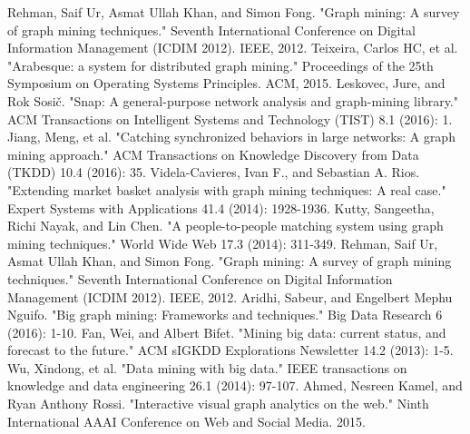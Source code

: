 \documentclass[letterpaper, 10 pt, conference]{ieeeconf}
\begin{document}
\addtolength{\textheight}{-12cm}

\hfill
\begin{thebibliography}{99}

 Rehman, Saif Ur, Asmat Ullah Khan, and Simon Fong. "Graph mining: A survey of graph mining techniques." Seventh International Conference on Digital Information Management (ICDIM 2012). IEEE, 2012.
 Teixeira, Carlos HC, et al. "Arabesque: a system for distributed graph mining." Proceedings of the 25th Symposium on Operating Systems Principles. ACM, 2015.
 Leskovec, Jure, and Rok Sosič. "Snap: A general-purpose network analysis and graph-mining library." ACM Transactions on Intelligent Systems and Technology (TIST) 8.1 (2016): 1.
 Jiang, Meng, et al. "Catching synchronized behaviors in large networks: A graph mining approach." ACM Transactions on Knowledge Discovery from Data (TKDD) 10.4 (2016): 35.
 Videla-Cavieres, Ivan F., and Sebastian A. Rios. "Extending market basket analysis with graph mining techniques: A real case." Expert Systems with Applications 41.4 (2014): 1928-1936.
 Kutty, Sangeetha, Richi Nayak, and Lin Chen. "A people-to-people matching system using graph mining techniques." World Wide Web 17.3 (2014): 311-349.
 Rehman, Saif Ur, Asmat Ullah Khan, and Simon Fong. "Graph mining: A survey of graph mining techniques." Seventh International Conference on Digital Information Management (ICDIM 2012). IEEE, 2012.
 Aridhi, Sabeur, and Engelbert Mephu Nguifo. "Big graph mining: Frameworks and techniques." Big Data Research 6 (2016): 1-10.
 Fan, Wei, and Albert Bifet. "Mining big data: current status, and forecast to the future." ACM sIGKDD Explorations Newsletter 14.2 (2013): 1-5.
 Wu, Xindong, et al. "Data mining with big data." IEEE transactions on knowledge and data engineering 26.1 (2014): 97-107.
 Ahmed, Nesreen Kamel, and Ryan Anthony Rossi. "Interactive visual graph analytics on the web." Ninth International AAAI Conference on Web and Social Media. 2015.

\end{thebibliography}
\end{document}
